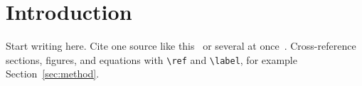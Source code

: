 \section{Introduction}
Start writing here. Cite one source like this~\cite{knuth1984texbook} or
several at once~\cite{knuth1984texbook,shannon1948communication}.
Cross-reference sections, figures, and equations with
\verb|\ref| and \verb|\label|, for example Section~\ref{sec:method}.
